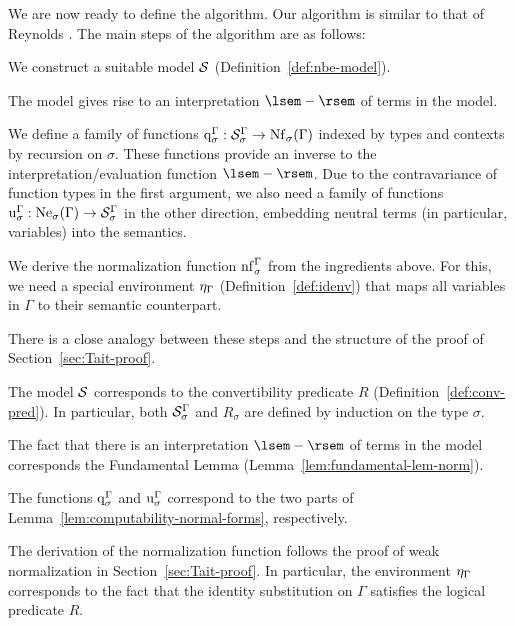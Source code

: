 We are now ready to define the algorithm. Our algorithm is similar to that of Reynolds \cite{reynolds1998normalization}. The main steps of the algorithm are as follows:
\begin{enum}
    \item We construct a suitable model $\mathcal{S}$ (Definition~\ref{def:nbe-model}).
    \item The model gives rise to an interpretation $\sem{-}$ of terms in the model.
    \item We define a family of functions $\mathrm{q}^{\Gamma}_{\sigma} : \mathcal{S}_{\sigma}^{\Gamma} \to \mathrm{Nf}_{\sigma}(\Gamma)$ indexed by types and contexts by recursion on $\sigma$. These functions provide an inverse to the interpretation/evaluation function $\sem{-}$. Due to the contravariance of function types in the first argument, we also need a family of functions $\mathrm{u}^{\Gamma}_{\sigma} : \mathrm{Ne}_{\sigma}(\Gamma) \to \mathcal{S}_{\sigma}^{\Gamma}$ in the other direction, embedding neutral terms (in particular, variables) into the semantics.
    \item We derive the normalization function $\mathrm{nf}^{\Gamma}_{\sigma}$ from the ingredients above. For this, we need a special environment $\eta_{\Gamma}$ (Definition~\ref{def:idenv}) that maps all variables in $\Gamma$ to their semantic counterpart.
\end{enum}

There is a close analogy between these steps and the structure of the proof of Section~\ref{sec:Tait-proof}.
\begin{enum}
    \item The model $\mathcal{S}$ corresponds to the convertibility predicate $R$ (Definition~\ref{def:conv-pred}). In particular, both $\mathcal{S}_{\sigma}^{\Gamma}$ and $R_\sigma$ are defined by induction on the type $\sigma$.
    \item The fact that there is an interpretation $\sem{-}$ of terms in the model corresponds the Fundamental Lemma (Lemma~\ref{lem:fundamental-lem-norm}).
    \item The functions $\mathrm{q}^{\Gamma}_{\sigma}$ and $\mathrm{u}^{\Gamma}_{\sigma}$ correspond to the two parts of Lemma~\ref{lem:computability-normal-forms}, respectively.
    \item The derivation of the normalization function follows the proof of weak normalization in Section~\ref{sec:Tait-proof}. In particular, the environment $\eta_{\Gamma}$ corresponds to the fact that the identity substitution on $\Gamma$ satisfies the logical predicate $R$.
\end{enum}

